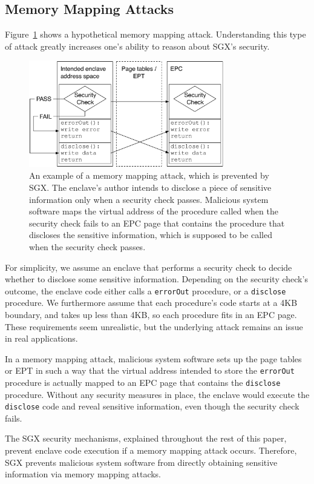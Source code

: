 \subsection{Memory Mapping Attacks}
\label{sec:memory_mapping_attacks}



Figure~\ref{fig:sgx_mapping_attack} shows a hypothetical memory mapping attack.
Understanding this type of attack
greatly increases one's ability to reason about SGX's security.

\begin{figure}[hbt]
  \centering
  \includegraphics[width=85mm]{figures/sgx_mapping_attack.pdf}
  \caption{
    An example of a memory mapping attack, which is prevented by SGX. The
    enclave's author intends to disclose a piece of sensitive information only
    when a security check passes. Malicious system software maps the virtual
    address of the procedure called when the security check fails to an EPC
    page that contains the procedure that discloses the sensitive information,
    which is supposed to be called when the security check passes.
  }
  \label{fig:sgx_mapping_attack}
\end{figure}

For simplicity, we assume an enclave that performs a security check to decide
whether to disclose some sensitive information. Depending on the security
check's outcome, the enclave code either calls a \texttt{errorOut} procedure,
or a \texttt{disclose} procedure. We furthermore assume that each procedure's
code starts at a 4KB boundary, and takes up less than 4KB, so each procedure
fits in an EPC page. These requirements seem unrealistic, but the underlying
attack remains an issue in real applications.

In a memory mapping attack, malicious system software sets up the page tables
or EPT in such a way that the virtual address intended to store the
\texttt{errorOut} procedure is actually mapped to an EPC page that contains the
\texttt{disclose} procedure. Without any security measures in place, the
enclave would execute the \texttt{disclose} code and reveal sensitive
information, even though the security check fails.

The SGX security mechanisms, explained throughout the rest of this paper,
prevent enclave code execution if a memory mapping attack occurs. Therefore,
SGX prevents malicious system software from directly obtaining sensitive
information via memory mapping attacks.





